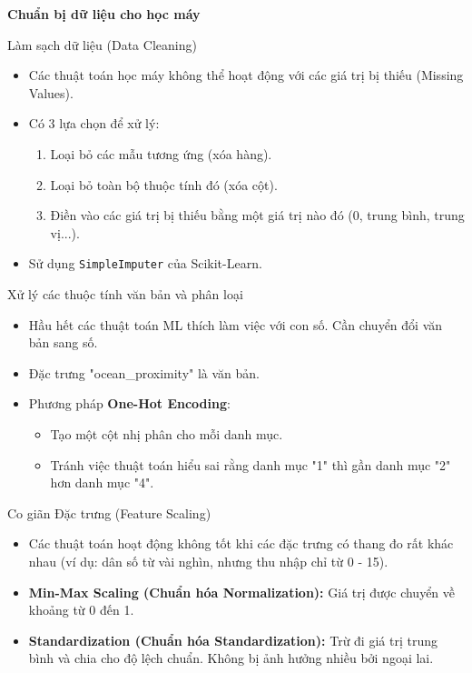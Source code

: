 \documentclass[aspectratio=169]{beamer}
\begin{document}
\begin{frame}
\vfill\centering\LARGE\textbf{Chuẩn bị dữ liệu cho học máy}\vfill
\end{frame}

\begin{frame}{Làm sạch dữ liệu (Data Cleaning)}
\begin{itemize}
    \item Các thuật toán học máy không thể hoạt động với các giá trị bị thiếu (Missing Values).
    \item Có 3 lựa chọn để xử lý:
    \begin{enumerate}
        \item Loại bỏ các mẫu tương ứng (xóa hàng).
        \item Loại bỏ toàn bộ thuộc tính đó (xóa cột).
        \item Điền vào các giá trị bị thiếu bằng một giá trị nào đó (0, trung bình, trung vị...).
    \end{enumerate}
    \item Sử dụng \texttt{SimpleImputer} của Scikit-Learn.
\end{itemize}
\end{frame}

\begin{frame}{Xử lý các thuộc tính văn bản và phân loại}
\begin{itemize}
    \item Hầu hết các thuật toán ML thích làm việc với con số. Cần chuyển đổi văn bản sang số.
    \item Đặc trưng "ocean\_proximity" là văn bản.
    \item Phương pháp \textbf{One-Hot Encoding}:
    \begin{itemize}
        \item Tạo một cột nhị phân cho mỗi danh mục.
        \item Tránh việc thuật toán hiểu sai rằng danh mục "1" thì gần danh mục "2" hơn danh mục "4".
    \end{itemize}
\end{itemize}
\end{frame}

\begin{frame}{Co giãn Đặc trưng (Feature Scaling)}
\begin{itemize}
    \item Các thuật toán hoạt động không tốt khi các đặc trưng có thang đo rất khác nhau (ví dụ: dân số từ vài nghìn, nhưng thu nhập chỉ từ 0 - 15).
    \item \textbf{Min-Max Scaling (Chuẩn hóa Normalization):} Giá trị được chuyển về khoảng từ 0 đến 1.
    \item \textbf{Standardization (Chuẩn hóa Standardization):} Trừ đi giá trị trung bình và chia cho độ lệch chuẩn. Không bị ảnh hưởng nhiều bởi ngoại lai.
\end{itemize}
\end{frame}
\end{document}
